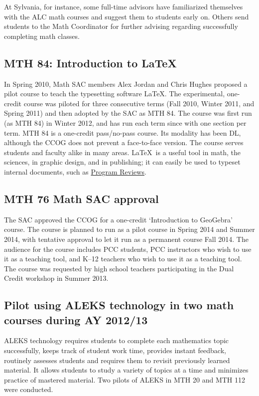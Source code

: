 
At Sylvania, for instance, some full-time advisors have familiarized themselves with the ALC math courses and
suggest them to students early on.  Others send students to the Math Coordinator for
further advising regarding successfully completing math classes.

\subsection{MTH 84: Introduction to \LaTeX}\label{other:sec:mth84}
In Spring 2010, Math SAC members Alex Jordan and Chris Hughes proposed a pilot
course to teach the typesetting software \LaTeX.  The experimental, one-credit course was piloted for
three consecutive terms (Fall 2010, Winter 2011, and Spring 2011) and then
adopted by the SAC as MTH 84.  The course was first run (as MTH 84) in Winter
2012, and has run each term since with one section per term. MTH 84 is a one-credit
pass/no-pass course. Its modality has been DL, although the CCOG does not
prevent a face-to-face version.  The course serves students and faculty alike in many areas.
\LaTeX\ is a useful tool in math, the sciences, in graphic design, and in
publishing; it can easily be used to typeset internal documents, such as \href{http://www.youtube.com/watch?v=XhduoHOYXUY}{\color{black}Program Reviews}.

\subsection{MTH 76 Math SAC approval}
The SAC approved the CCOG for a one-credit `Introduction to GeoGebra' course. The course is
planned to run as a pilot course in Spring 2014 and Summer 2014, with tentative
approval to let it run as a permanent course Fall 2014.  The audience for the
course includes PCC students, PCC instructors who wish to use it as a teaching
tool, and K--12 teachers who wish to use it as a teaching tool.  The course was
requested by high school teachers participating in the Dual Credit workshop in Summer 2013.

\subsection[ALEKS pilot]{Pilot using ALEKS technology in two math courses during AY 2012/13}\label{sec3:subset:alekspilot}
ALEKS technology requires students to complete each mathematics topic
successfully, keeps track of student work time, provides instant feedback,
routinely assesses students and requires them to revisit previously learned
material.  It allows students to study a variety of topics at a time and
minimizes practice of mastered material. Two pilots of ALEKS in MTH 20 and MTH
112 were conducted.

